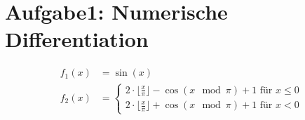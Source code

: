 \newpage
\section{Aufgabe1: Numerische Differentiation}
\label{sec:auf1}

\begin{align}
  f_1(x) &= \sin(x)\\
  f_2(x) &= \left\{
    \begin{matrix}
    2\cdot \lfloor\frac{x}{\pi} \rfloor -\cos(x\mod \pi) + 1 \text{ für } x \leq 0\\
    2\cdot \lfloor\frac{x}{\pi} \rfloor +\cos(x\mod \pi) + 1 \text{ für } x < 0
    \end{matrix}
    \right.
\end{align}

